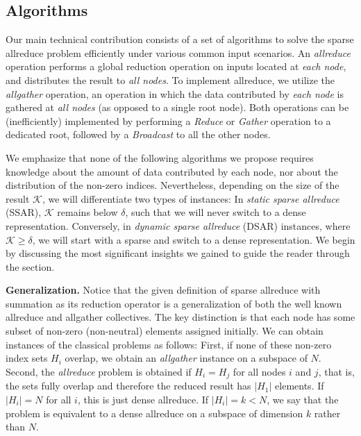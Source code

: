 \documentclass[11pt]{article}
\renewcommand{\paragraph}[1]{\vspace{0.1em} \noindent \textbf{#1}}
\begin{document}
\subsection{Algorithms}

\newcommand{\ssarone}{SSAR\_Recursive\_double}
\newcommand{\ssartwo}{SSAR\_Split\_allgather}
\newcommand{\dsar}{DSAR\_Split\_allgather}

Our main technical contribution consists of a set of algorithms to solve
the sparse allreduce problem efficiently under various common input
scenarios.  
%
An \emph{allreduce} operation performs a global reduction operation on
inputs located at \emph{each node}, and distributes the result to
\emph{all nodes}. 
%
To implement allreduce, we utilize the \emph{allgather} operation, an
operation in which the data contributed by \emph{each node} is gathered
at \emph{all nodes} (as opposed to a single root node). 
%
Both operations can be (inefficiently) implemented by performing a \emph{Reduce} or
\emph{Gather} operation to a dedicated root, followed by a
\emph{Broadcast} to all the other nodes.

We emphasize that none of the following algorithms we propose requires
knowledge about the amount of data contributed by each node, nor about
the distribution of the non-zero indices.  Nevertheless, depending on
the size of the result $\mathcal{K}$, we will differentiate two types of
instances: In \emph{static sparse allreduce} (SSAR), $\mathcal{K}$
remains below $\delta$, such that we will never switch to a dense
representation. 
%
Conversely, in \emph{dynamic sparse allreduce} (DSAR) instances, where
$\mathcal{K} \geq \delta$, we will start with a sparse and switch to a
dense representation.
%
We begin by discussing the most significant insights we
gained to guide the reader through the section.

\paragraph{Generalization. } Notice that the given definition of sparse
allreduce with summation as its reduction operator is a generalization
of both the well known allreduce and allgather collectives.  The key
distinction is that each node has some subset of non-zero (non-neutral)
elements assigned initially. We can obtain instances of the classical
problems as follows:  First, if none of these non-zero index sets $H_i$
overlap, we obtain an \emph{allgather} instance on a subspace of $N$.
Second, the \emph{allreduce} problem is
obtained if $H_i = H_j$ for all nodes $i$ and $j$, that is, the sets
fully overlap and therefore the reduced result has $\vert H_1 \vert$
elements. If $\vert H_i \vert = N$ for all $i$, this is just dense
allreduce. If $\vert H_i \vert = k < N$, we say that the problem is
equivalent to a dense allreduce on a subspace of dimension $k$ rather
than $N$.
\end{document}
